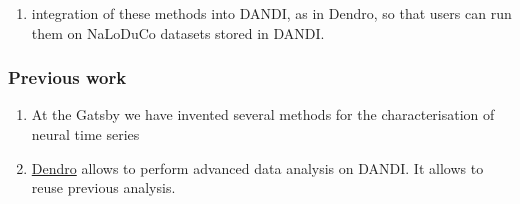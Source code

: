 \documentclass{beamer}
\begin{document}
\begin{frame}
\begin{enumerate}
\begin{scriptsize}
\begin{itemize}
    
        \end{itemize}
        \end{scriptsize}
    
        \item integration of these methods into DANDI, as in Dendro, so that users
        can run them on NaLoDuCo datasets stored in DANDI.

    \end{enumerate}

\end{frame}

\begin{frame}
    \frametitle{Previous work}

    \begin{enumerate}

		\item At the Gatsby we have invented several methods for the
		characterisation of neural time
		series~\citep[e.g.,][]{yuEtAl09,dunckerAndSahani18,ruttenEtAl20,yuEtAl24,buesingEtAl12a,buesingEtAl12b,mackeEtAl15,soulatEtAl21,walkerEtAl23,turnerAndSahani14,osheaEtAl22}

		\item \href{https://github.com/magland/dendro}{Dendro} allows to
		perform advanced data analysis on DANDI. It allows to reuse previous
		analysis.

    \end{enumerate}

\end{frame}



\end{document}
